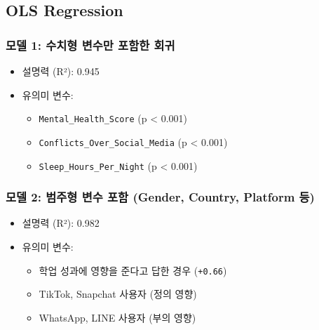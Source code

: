 \documentclass[11pt]{article}
\providecommand{\tightlist}{%
      \setlength{\itemsep}{0pt}\setlength{\parskip}{0pt}}
\begin{document}
    \subsection{OLS Regression}\label{ols-regression}

\subsubsection{모델 1: 수치형 변수만 포함한
회귀}\label{uxbaa8uxb378-1-uxc218uxce58uxd615-uxbcc0uxc218uxb9cc-uxd3ecuxd568uxd55c-uxd68cuxadc0}

\begin{itemize}
\tightlist
\item
  설명력 (R²): 0.945
\item
  유의미 변수:

  \begin{itemize}
  \tightlist
  \item
    \texttt{Mental\_Health\_Score} (p \textless{} 0.001)
  \item
    \texttt{Conflicts\_Over\_Social\_Media} (p \textless{} 0.001)
  \item
    \texttt{Sleep\_Hours\_Per\_Night} (p \textless{} 0.001)
  \end{itemize}
\end{itemize}

\subsubsection{모델 2: 범주형 변수 포함 (Gender, Country, Platform
등)}\label{uxbaa8uxb378-2-uxbc94uxc8fcuxd615-uxbcc0uxc218-uxd3ecuxd568-gender-country-platform-uxb4f1}

\begin{itemize}
\tightlist
\item
  설명력 (R²): 0.982
\item
  유의미 변수:

  \begin{itemize}
  \tightlist
  \item
    학업 성과에 영향을 준다고 답한 경우 (\texttt{+0.66})
  \item
    TikTok, Snapchat 사용자 (정의 영향)
  \item
    WhatsApp, LINE 사용자 (부의 영향)
  \end{itemize}
\end{itemize}
\end{document}
